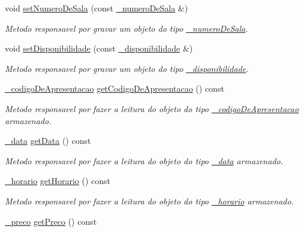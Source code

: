 \begin{DoxyCompactItemize}
void \mbox{\hyperlink{class__apresentacao_af15b6f040caeba269c4f040dc28ce316}{set\+Numero\+De\+Sala}} (const \mbox{\hyperlink{class__numero_de_sala}{\+\_\+numero\+De\+Sala}} \&)
\begin{DoxyCompactList}\small\item\em Metodo responsavel por gravar um objeto do tipo \mbox{\hyperlink{class__numero_de_sala}{\+\_\+numero\+De\+Sala}}. \end{DoxyCompactList}\item 
void \mbox{\hyperlink{class__apresentacao_a32881d74b3c5652ac5efbd9fb2323464}{set\+Disponibilidade}} (const \mbox{\hyperlink{class__disponibilidade}{\+\_\+disponibilidade}} \&)
\begin{DoxyCompactList}\small\item\em Metodo responsavel por gravar um objeto do tipo \mbox{\hyperlink{class__disponibilidade}{\+\_\+disponibilidade}}. \end{DoxyCompactList}\item 
\mbox{\hyperlink{class__codigo_de_apresentacao}{\+\_\+codigo\+De\+Apresentacao}} \mbox{\hyperlink{class__apresentacao_aa51711787949191588c4ed23ed48c859}{get\+Codigo\+De\+Apresentacao}} () const
\begin{DoxyCompactList}\small\item\em Metodo responsavel por fazer a leitura do objeto do tipo \mbox{\hyperlink{class__codigo_de_apresentacao}{\+\_\+codigo\+De\+Apresentacao}} armazenado. \end{DoxyCompactList}\item 
\mbox{\hyperlink{class__data}{\+\_\+data}} \mbox{\hyperlink{class__apresentacao_a43f87997a319fab4f88b78846813badf}{get\+Data}} () const
\begin{DoxyCompactList}\small\item\em Metodo responsavel por fazer a leitura do objeto do tipo \mbox{\hyperlink{class__data}{\+\_\+data}} armazenado. \end{DoxyCompactList}\item 
\mbox{\hyperlink{class__horario}{\+\_\+horario}} \mbox{\hyperlink{class__apresentacao_a6d8bad7be674d204bf8b429301849ab4}{get\+Horario}} () const
\begin{DoxyCompactList}\small\item\em Metodo responsavel por fazer a leitura do objeto do tipo \mbox{\hyperlink{class__horario}{\+\_\+horario}} armazenado. \end{DoxyCompactList}\item 
\mbox{\hyperlink{class__preco}{\+\_\+preco}} \mbox{\hyperlink{class__apresentacao_acb5398a12d2ec7cc11ebc1213a689079}{get\+Preco}} () const

\end{DoxyCompactItemize}
